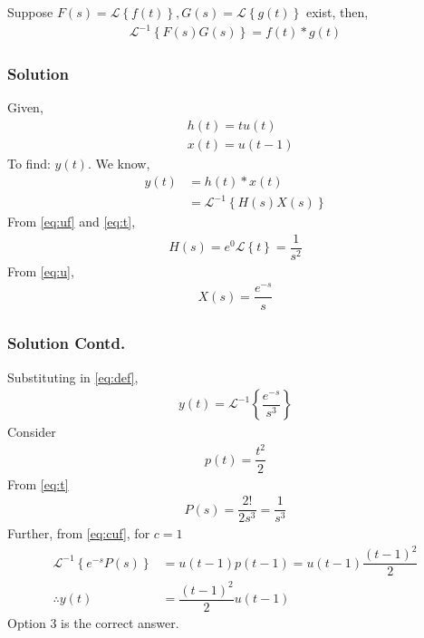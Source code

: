 \documentclass{beamer}
\providecommand{\cbrak}[1]{\ensuremath{\left\{#1\right\}}}
\begin{document}
\begin{frame}
\frametitle{}
\begin{theorem}
Suppose $F(s)=\mathcal{L}\cbrak{f(t)}, G(s)=\mathcal{L}\cbrak{g(t)}$ exist, then,
\begin{align}
    \mathcal{L}^{-1}\cbrak{F(s)G(s)}=f(t)*g(t)\label{eq:cuf}
\end{align}
\end{theorem}
\end{frame}


\begin{frame}
\frametitle{Solution}
Given,
\begin{align}
    &h(t)=tu(t)\\
    &x(t)=u(t-1)
\end{align}
To find: $y(t)$. We know, 
\begin{align}
y(t)&=h(t)*x(t)\\
&=\mathcal{L}^{-1}\cbrak{H(s)X(s)}
\label{eq:def}
\end{align}
From \eqref{eq:uf} and \eqref{eq:t}, 
\begin{align}
H(s)=e^{0}\mathcal{L}\cbrak{t}=\dfrac{1}{s^2}
\end{align}
From \eqref{eq:u}, 
\begin{align}
X(s)=\dfrac{e^{-s}}{s}
\end{align}
\end{frame}

\begin{frame}
\frametitle{Solution Contd.}
Substituting in \eqref{eq:def},
\begin{align}
y(t)=\mathcal{L}^{-1}\cbrak{\dfrac{e^{-s}}{s^3}}
\end{align}
Consider 
\begin{align}
    p(t)=\dfrac{t^{2}}{2}
\end{align}
From \eqref{eq:t}
\begin{align}
    P(s)=\dfrac{2!}{2s^3}=\dfrac{1}{s^3}
\end{align}
Further, from \eqref{eq:cuf}, for $c=1$
\begin{align}
    \mathcal{L}^{-1}\cbrak{e^{-s}P(s)}&=u(t-1)p(t-1)=u(t-1)\dfrac{(t-1)^2}{2}\\
    \therefore y(t)&=\dfrac{(t-1)^2}{2}u(t-1)
\end{align}
Option 3 is the correct answer.
\end{frame}
\end{document}
